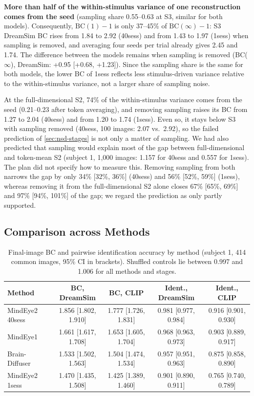 \documentclass[11pt,a4paper]{article}
\begin{document}
\textbf{More than half of the within-stimulus variance of one reconstruction
comes from the seed} (sampling share 0.55--0.63 at S3, similar for both models).
Consequently, $\mathrm{BC}(1)-1$ is only 37--45\% of $\mathrm{BC}(\infty)-1$: S3
DreamSim BC rises from 1.84 to 2.92 (40sess) and from 1.43 to 1.97 (1sess) when
sampling is removed, and averaging four seeds per trial already gives 2.45
and 1.74. The difference between the models remains when sampling is removed
(BC($\infty$), DreamSim: +0.95 [+0.68, +1.23]). Since the sampling share is the
same for both models, the lower BC of 1sess reflects less stimulus-driven
variance relative to the within-stimulus variance, not a larger share of
sampling noise.

At the full-dimensional S2, 74\% of the within-stimulus variance comes from the
seed (0.21--0.23 after token averaging), and removing sampling raises its BC
from 1.27 to 2.04 (40sess) and from 1.20 to 1.74 (1sess). Even so, it stays
below S3 with sampling removed (40sess, 100 images: 2.07 vs.\ 2.92), so the
failed prediction of \cref{sec:nsd-stages} is not only a matter of sampling. We
had also predicted that sampling would explain most of the gap between
full-dimensional and token-mean S2 (subject 1, 1,000 images: 1.157 for 40sess
and 0.557 for 1sess). The plan did not specify how to measure this. Removing
sampling from both narrows the gap by only 34\% [32\%, 36\%] (40sess) and 56\%
[52\%, 59\%] (1sess), whereas removing it from the full-dimensional S2 alone
closes 67\% [65\%, 69\%] and 97\% [94\%, 101\%] of the gap; we regard the
prediction as only partly supported.

\subsection{Comparison across Methods}
\label{sec:nsd-methods}

\begin{table}[tbp]
\centering
\caption{Final-image BC and pairwise identification accuracy by method
  (subject 1, 414 common images, 95\% CI in brackets). Shuffled controls lie
  between 0.997 and 1.006 for all methods and stages.}
\label{tab:methods}
\footnotesize
\setlength{\tabcolsep}{3pt}
\begin{tabular}{lcccc}
\toprule
Method & BC, DreamSim & BC, CLIP & Ident., DreamSim & Ident., CLIP \\
\midrule
MindEye2 40sess & 1.856 [1.802, 1.910] & 1.777 [1.726, 1.831] & 0.981 [0.977, 0.984] & 0.916 [0.901, 0.930] \\
MindEye1        & 1.661 [1.617, 1.708] & 1.653 [1.605, 1.704] & 0.968 [0.963, 0.973] & 0.903 [0.889, 0.917] \\
Brain-Diffuser  & 1.533 [1.502, 1.563] & 1.504 [1.474, 1.534] & 0.957 [0.951, 0.963] & 0.875 [0.858, 0.890] \\
MindEye2 1sess  & 1.470 [1.435, 1.508] & 1.425 [1.389, 1.460] & 0.901 [0.890, 0.911] & 0.765 [0.740, 0.789] \\
\bottomrule
\end{tabular}
\end{table}
\end{document}
